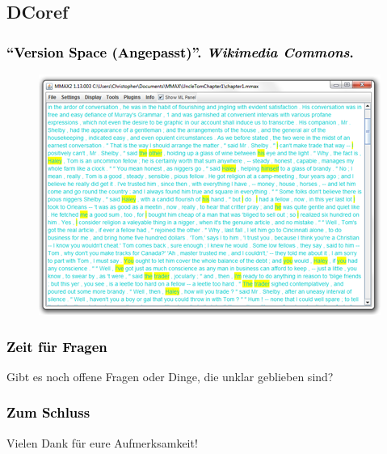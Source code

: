 \documentclass[xcolor=dvipsnames]{beamer}
\begin{document}

\subsection{DCoref}


\begin{frame}\frametitle{\textcolor{black}{``{Version Space (Angepasst)}''. \emph{Wikimedia Commons}.}}
\begin{figure}
\includegraphics{cm_mmax.png}
\end{figure}

\end{frame}

\addtocounter{framenumber}{-3}


\begin{frame}[plain]
\frametitle{\textcolor{black}{Zeit für Fragen}}
Gibt es noch offene Fragen oder Dinge, die unklar geblieben sind?
\end{frame}

\begin{frame}[plain]
\frametitle{\textcolor{black}{Zum Schluss}}
Vielen Dank für eure Aufmerksamkeit!
\end{frame}

\end{document}

